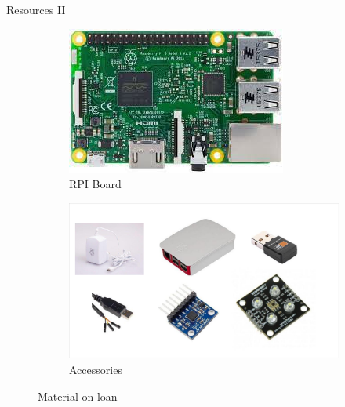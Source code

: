 \begin{frame}{Resources II}
    \begin{figure}[h]
        \centering
        \begin{subfigure}[b]{0.45\textwidth}
            \centering
            \includegraphics[width=\textwidth]{trainingmaterials/presentation/rpi.jpeg}
            \caption{RPI Board}
            \label{fig:rpi}
        \end{subfigure}
        \hfill
        \begin{subfigure}[b]{0.45\textwidth}
            \centering
            \includegraphics[width=\textwidth]{trainingmaterials/presentation/accesories.pdf}
            \caption{Accessories}
            \label{fig:accesories}
        \end{subfigure}
        \caption{Material on loan}
        \label{fig:figures}
    \end{figure}
\end{frame}

